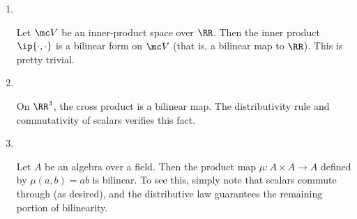 \documentclass{fkbook}
\theoremstyle{snazzydefinition}
\renewenvironment{example}
  {\pushQED{\oldqed}\renewcommand{\qedsymbol}{$\triangle$}\examplex}
  {\popQED\endexamplex}
\begin{document}
  \begin{enumerate}[label=\arabic*.]
    \item ~\vspace{-1.25em}
      \begin{leftbar}\vspace{-1em}
        \begin{example}
          Let $\mc V$ be an inner-product space over $\RR$. Then the
          inner product $\ip{\cdot, \cdot}$ is a bilinear form on $\mc
          V$ (that is, a bilinear map to $\RR$). This is pretty
          trivial.
        \end{example}
      \end{leftbar}
    \item ~\vspace{-1.25em}
      \begin{leftbar}\vspace{-1em}
        \begin{example}
          On $\RR^3$, the cross product is a bilinear map. The
          distributivity rule and commutativity of scalars verifies
          this fact.
        \end{example}
      \end{leftbar}
    \item~\vspace{-1.25em}
      \begin{leftbar}\vspace{-1em}
        \begin{example}
          Let $A$ be an algebra over a field. Then the product map $\mu :
          A \times A \to A$ defined by $\mu(a,b) = ab$ is bilinear. To see
          this, simply note that scalars commute through (as desired), and
          the distributive law guarantees the remaining portion of
          bilinearity.


\end{example}
\end{leftbar}
\end{enumerate}
\end{document}
